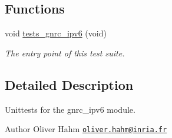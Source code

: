 \subsection*{Functions}
\begin{DoxyCompactItemize}
\item 
void \hyperlink{group__unittests_gaec5ea3d48a03bd5f1f2194f33ce38010}{tests\+\_\+gnrc\+\_\+ipv6} (void)
\begin{DoxyCompactList}\small\item\em The entry point of this test suite. \end{DoxyCompactList}\end{DoxyCompactItemize}


\subsection{Detailed Description}
Unittests for the {\ttfamily gnrc\+\_\+ipv6} module. 

\begin{DoxyAuthor}{Author}
Oliver Hahm \href{mailto:oliver.hahm@inria.fr}{\tt oliver.\+hahm@inria.\+fr} 
\end{DoxyAuthor}
